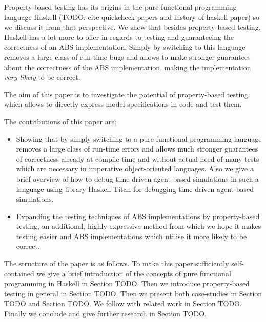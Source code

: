 Property-based testing has its origins in the pure functional programming language Haskell (TODO: cite quickcheck papers and history of haskell paper) so we discuss it from that perspective. We show that besides property-based testing, Haskell has a lot more to offer in regards to testing and guaranteeing the correctness of an ABS implementation. Simply by switching to this language removes a large class of run-time bugs and allows to make stronger guarantees about the correctness of the ABS implementation, making the implementation \textit{very likely} to be correct.

The aim of this paper is to investigate the potential of property-based testing which allows to directly express model-specifications in code and test them. 

The contributions of this paper are:
\begin{itemize}
	\item Showing that by simply switching to a pure functional programming language removes a large class of run-time errors and allows much stronger guarantees of correctness already at compile time and without actual need of many tests which are necessary in imperative object-oriented languages. Also we give a brief overview of how to debug time-driven agent-based simulations in such a language using library Haskell-Titan for debugging time-driven agent-based simulations.
	\item Expanding the testing techniques of ABS implementations by property-based testing, an additional, highly expressive method from which we hope it makes testing easier and ABS implementations which utilise it more likely to be correct.
\end{itemize}

The structure of the paper is as follows. To make this paper sufficiently self-contained we give a brief introduction of the concepts of pure functional programming in Haskell in Section TODO. Then we introduce property-based testing in general in Section TODO. Then we present both case-studies in Section TODO and Section TODO. We follow with related work in Section TODO. Finally we conclude and give further research in Section TODO. 